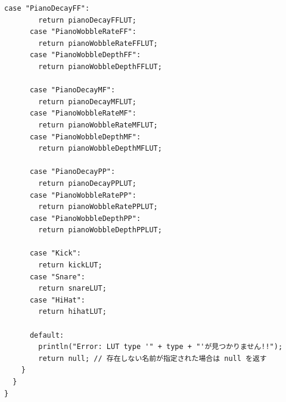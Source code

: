 \begin{lstlisting}[caption={Utils.pde}, label={lst:proc_utils}]
      case "PianoDecayFF":
        return pianoDecayFFLUT;
      case "PianoWobbleRateFF":
        return pianoWobbleRateFFLUT;
      case "PianoWobbleDepthFF":
        return pianoWobbleDepthFFLUT;
        
      case "PianoDecayMF":
        return pianoDecayMFLUT;
      case "PianoWobbleRateMF":
        return pianoWobbleRateMFLUT;
      case "PianoWobbleDepthMF":
        return pianoWobbleDepthMFLUT;
        
      case "PianoDecayPP":
        return pianoDecayPPLUT;
      case "PianoWobbleRatePP":
        return pianoWobbleRatePPLUT;
      case "PianoWobbleDepthPP":
        return pianoWobbleDepthPPLUT;
        
      case "Kick":
        return kickLUT;
      case "Snare":
        return snareLUT;
      case "HiHat":
        return hihatLUT;
        
      default:
        println("Error: LUT type '" + type + "'が見つかりません!!");
        return null; // 存在しない名前が指定された場合は null を返す
    }
  }
}
\end{lstlisting}

